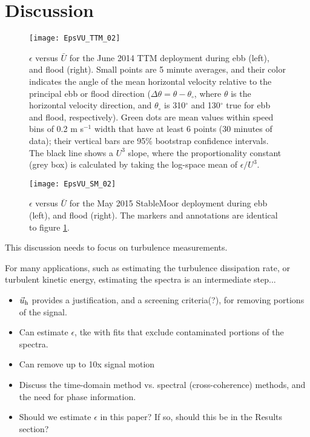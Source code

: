 
\section{Discussion}

\begin{figure*}[t]
  \centering
  \texttt{[image: EpsVU\_TTM\_02]}
  \caption{$\epsilon$ versus $\bar{U}$ for the June 2014 TTM deployment during ebb (left), and flood (right). Small points are 5 minute averages, and their color indicates the angle of the mean horizontal velocity relative to the principal ebb or flood direction ($\Delta\theta=\theta-\theta_\circ$, where $\theta$ is the horizontal velocity direction, and $\theta_\circ$ is 310$^\circ$ and 130$^\circ$ true for ebb and flood, respectively).  Green dots are mean values within speed bins of 0.2 m s$^{-1}$ width that have at least 6 points (30 minutes of data); their vertical bars are 95\% bootstrap confidence intervals. The black line shows a $U^3$ slope, where the proportionality constant (grey box) is calculated by taking the log-space mean of $\epsilon/U^3$. }
  \label{fig:epsVu:ttm}
\end{figure*}

\begin{figure*}[t]
  \centering
  \texttt{[image: EpsVU\_SM\_02]}
  \caption{$\epsilon$ versus $\bar{U}$ for the May 2015 StableMoor deployment during ebb (left), and flood (right). The markers and annotations are identical to figure \ref{fig:epsVu:ttm}. }
  \label{fig:epsVu:sm}
\end{figure*}

This discussion needs to focus on turbulence measurements.

For many applications, such as estimating the turbulence dissipation rate, or turbulent kinetic energy, estimating the spectra is an intermediate step...
\begin{itemize}
\item $\vec{u}_\mathrm{h}$ provides a justification, and a screening criteria(?), for removing portions of the signal.
\item Can estimate $\epsilon$, tke with fits that exclude contaminated portions of the spectra.
\item Can remove up to 10x signal motion
\item Discuss the time-domain method vs. spectral (cross-coherence) methods, and the need for phase information.
\item Should we estimate $\epsilon$ in this paper? If so, should this be in the Results section?
\end{itemize}



